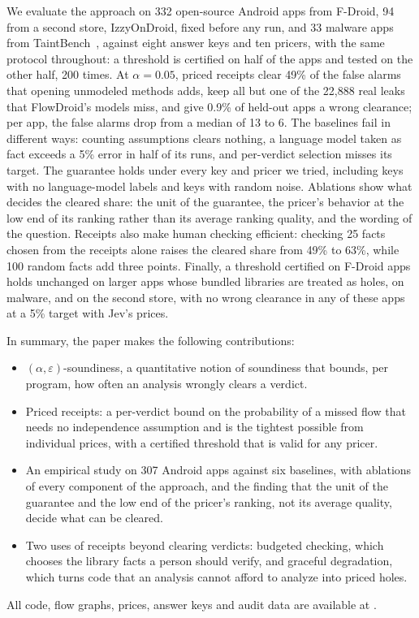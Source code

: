 We evaluate the approach on 332 open-source Android apps from F-Droid, 94 from a second store, IzzyOnDroid, fixed before any run, and 33 malware apps from TaintBench~\cite{taintbench}, against eight answer keys and ten pricers, with the same protocol throughout: a threshold is certified on half of the apps and tested on the other half, 200 times.
At $\alpha=0.05$, priced receipts clear 49\% of the false alarms that opening unmodeled methods adds, keep all but one of the 22{,}888 real leaks that FlowDroid's models miss, and give 0.9\% of held-out apps a wrong clearance; per app, the false alarms drop from a median of 13 to 6.
The baselines fail in different ways: counting assumptions clears nothing, a language model taken as fact exceeds a 5\% error in half of its runs, and per-verdict selection misses its target.
The guarantee holds under every key and pricer we tried, including keys with no language-model labels and keys with random noise.
Ablations show what decides the cleared share: the unit of the guarantee, the pricer's behavior at the low end of its ranking rather than its average ranking quality, and the wording of the question.
Receipts also make human checking efficient: checking 25 facts chosen from the receipts alone raises the cleared share from 49\% to 63\%, while 100 random facts add three points.
Finally, a threshold certified on F-Droid apps holds unchanged on larger apps whose bundled libraries are treated as holes, on malware, and on the second store, with no wrong clearance in any of these apps at a 5\% target with Jev's prices.

In summary, the paper makes the following contributions:
\begin{itemize}
\item $(\alpha,\varepsilon)$-soundiness, a quantitative notion of soundiness that bounds, per program, how often an analysis wrongly clears a verdict.
\item Priced receipts: a per-verdict bound on the probability of a missed flow that needs no independence assumption and is the tightest possible from individual prices, with a certified threshold that is valid for any pricer.
\item An empirical study on 307 Android apps against six baselines, with ablations of every component of the approach, and the finding that the unit of the guarantee and the low end of the pricer's ranking, not its average quality, decide what can be cleared.
\item Two uses of receipts beyond clearing verdicts: budgeted checking, which chooses the library facts a person should verify, and graceful degradation, which turns code that an analysis cannot afford to analyze into priced holes.
\end{itemize}
All code, flow graphs, prices, answer keys and audit data are available at .
